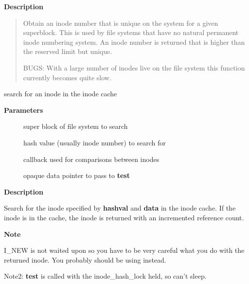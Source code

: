 \documentclass[a4paper,8pt,english]{sphinxmanual}
\begin{document}
\textbf{Description}
\begin{quote}

Obtain an inode number that is unique on the system for a given
superblock. This is used by file systems that have no natural
permanent inode numbering system. An inode number is returned that
is higher than the reserved limit but unique.

BUGS:
With a large number of inodes live on the file system this function
currently becomes quite slow.
\end{quote}

\begin{fulllineitems}
\label{filesystems/index:c.ilookup5_nowait}
search for an inode in the inode cache

\end{fulllineitems}


\textbf{Parameters}
\begin{description}
\item[{}] \leavevmode
super block of file system to search

\item[{}] \leavevmode
hash value (usually inode number) to search for

\item[{}] \leavevmode
callback used for comparisons between inodes

\item[{}] \leavevmode
opaque data pointer to pass to \textbf{test}

\end{description}

\textbf{Description}

Search for the inode specified by \textbf{hashval} and \textbf{data} in the inode cache.
If the inode is in the cache, the inode is returned with an incremented
reference count.

\textbf{Note}

I\_NEW is not waited upon so you have to be very careful what you do
with the returned inode.  You probably should be using {\hyperref[filesystems/index:c.ilookup5]{\emph{}}} instead.

Note2: \textbf{test} is called with the inode\_hash\_lock held, so can't sleep.
\end{document}
